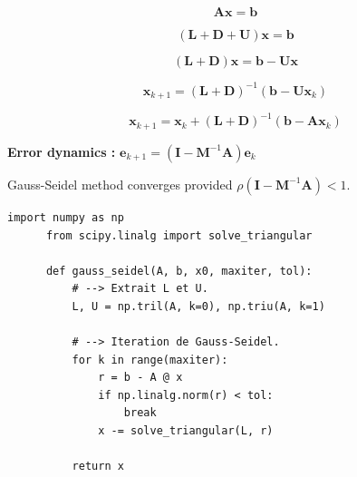\documentclass[aspectratio=169]{beamer}
\begin{document}
\begin{frame}
  \begin{overprint}
    \Large
    \[
    \bm{Ax} = \bm{b}
    \]

    \Large
    \[
    \left( \bm{L} + \bm{D} + \bm{U} \right) \bm{x} = \bm{b}
    \]

    \Large
    \[
    \left( \bm{L} + \bm{D} \right) \bm{x} = \bm{b} - \bm{Ux}
    \]

    \Large
    \[
    \bm{x}_{k+1} = \left( \bm{L} + \bm{D} \right)^{-1} \left( \bm{b} - \bm{Ux}_k \right)
    \]

    \Large
    \[
    \bm{x}_{k+1} = \bm{x}_k + \left( \bm{L} + \bm{D} \right)^{-1} \left( \bm{b} - \bm{Ax}_k \right)
    \]

  \end{overprint}

  \vspace{-1cm}
\end{frame}

\begin{frame}
  \centering
  \textbf{Error dynamics :} \( \bm{e}_{k+1} = \left( \bm{I} - \bm{M}^{-1} \bm{A} \right) \bm{e}_k \)
  
  \bigskip
  
  Gauss-Seidel method converges provided $\rho \left(\bm{I} - \bm{M}^{-1} \bm{A} \right) < 1$.

  \vspace{-1cm}
\end{frame}

{
  \begin{frame}[fragile]{}{}
    \vfill
    \begin{lstlisting}[backgroundcolor=\color{white}, basicstyle=\ttfamily\footnotesize\color{black}]
      import numpy as np
      from scipy.linalg import solve_triangular

      def gauss_seidel(A, b, x0, maxiter, tol):
          # --> Extrait L et U.
          L, U = np.tril(A, k=0), np.triu(A, k=1)

          # --> Iteration de Gauss-Seidel.
          for k in range(maxiter):
              r = b - A @ x
              if np.linalg.norm(r) < tol:
                  break
              x -= solve_triangular(L, r)

          return x

    \end{lstlisting}
    \vfill
  \end{frame}
}
\end{document}
